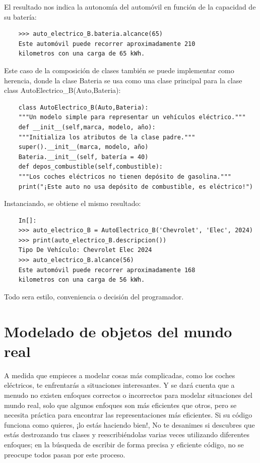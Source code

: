 {El resultado nos indica la autonomía del automóvil en función de la capacidad de su batería:

\begin{lstlisting}
	>>> auto_electrico_B.bateria.alcance(65)
	Este automóvil puede recorrer aproximadamente 210
	kilometros con una carga de 65 kWh.
\end{lstlisting}


Este caso de la composición de clases también se puede implementar como herencia, donde la clase {\ttfamily Bateria} se usa como una clase principal para la clase {\ttfamily class AutoElectrico\_B(Auto,Bateria)}:

\begin{lstlisting}
	class AutoElectrico_B(Auto,Bateria):
	"""Un modelo simple para representar un vehículos eléctrico."""
	def __init__(self,marca, modelo, año):
	"""Initializa los atributos de la clase padre."""
	super().__init__(marca, modelo, año)
	Bateria.__init__(self, batería = 40)
	def depos_combustible(self,combustible):
	"""Los coches eléctricos no tienen depósito de gasolina."""
	print("¡Este auto no usa depósito de combustible, es eléctrico!")
\end{lstlisting}

Instanciando, se obtiene el mismo resultado:

\begin{lstlisting}
	In[]:
	>>> auto_electrico_B = AutoElectrico_B('Chevrolet', 'Elec', 2024)
	>>> print(auto_electrico_B.descripcion())
	Tipo De Vehículo: Chevrolet Elec 2024 
	>>> auto_electrico_B.alcance(56) 
	Este automóvil puede recorrer aproximadamente 168
	kilometros con una carga de 56 kWh.
\end{lstlisting}

Todo sera estilo, conveniencia o decisión del programador.

\section{Modelado de objetos del mundo real}

A medida que empieces a modelar cosas más complicadas, como los coches eléctricos, te enfrentarás a situaciones  interesantes. Y se dará cuenta que a menudo no existen enfoques correctos o incorrectos para modelar situaciones del mundo real, solo que algunos enfoques son más eficientes que otros, pero se necesita práctica para encontrar las representaciones más eficientes.  Si su código funciona como quieres, ¡lo estás haciendo bien!, No te desanimes
si descubres que estás destrozando tus clases y reescribiéndolas varias veces utilizando diferentes enfoques; en la búsqueda de escribir de forma precisa y eficiente código, no se preocupe todos pasan por este proceso.





}
